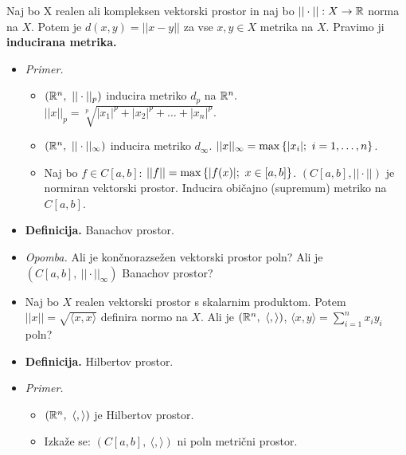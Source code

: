 \begin{enumerate}
    Naj bo X realen ali kompleksen vektorski prostor in naj bo $||\cdot||: X \to \mathbb{R}$ norma na $X$. Potem je $d(x,y) = ||x-y||$ za vse $x,y \in X$ metrika na $X$. Pravimo ji \textbf{inducirana metrika.}
    \begin{itemize}
        \item \colorbox{yellow!30}{\emph{Primer.}} 
        \begin{itemize}
            \item $(\mathbb{R}^n, \ ||\cdot||_p)$ inducira metriko $d_p$ na $\mathbb{R}^n.$ $||x||_p = \sqrt[p]{|x_1|^p + |x_2|^p + \ldots + |x_n|^p}$.
            \item $(\mathbb{R}^n, \ ||\cdot||_\infty)$ inducira metriko $d_\infty$. $||x||_\infty = \max \left\{|x_i|; \ i = 1, \ldots, n\right\}$.     
            \item Naj bo $f \in C[a,b]$: $||f|| = \max \left\{|f(x)|; \ x \in [a,b]\right\}$. $(C[a,b], ||\cdot||)$ je normiran vektorski prostor. Inducira običajno (supremum) metriko na $C[a,b]$.
        \end{itemize}        
        \item \colorbox{purple!30}{\textbf{Definicija.}} Banachov prostor.
        \item \colorbox{yellow!30}{\emph{Opomba.}} Ali je končnorazsežen vektorski prostor poln? Ali je $(C[a,b], \ ||\cdot||_\infty)$ Banachov prostor?
        \item Naj bo $X$ realen vektorski prostor s skalarnim produktom. Potem $||x|| = \sqrt{\langle x,x \rangle }$ definira normo na $X$. Ali je $(\mathbb{R}^n, \ \langle , \rangle)$, $\langle x, y\rangle = \sum_{i=1}^{n}x_i y_i$ poln?
        \item \colorbox{purple!30}{\textbf{Definicija.}} Hilbertov prostor.
        \item \colorbox{yellow!30}{\emph{Primer.}}
        \begin{itemize}
            \item $(\mathbb{R}^n, \ \langle , \rangle)$ je Hilbertov prostor.
            \item Izkaže se: $(C[a,b], \ \langle , \rangle)$ ni poln metrični prostor.
        \end{itemize}
    \end{itemize}
\end{enumerate}

